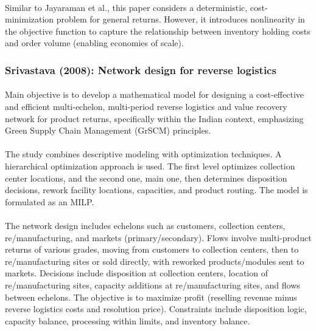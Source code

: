 \paragraph{} Similar to Jayaraman et al., this paper considers a deterministic, cost-minimization problem for general returns. However, it introduces nonlinearity in the objective function to capture the relationship between inventory holding costs and order volume (enabling economies of scale).

\subsubsection{Srivastava (2008): Network design for reverse logistics}

\paragraph{} Main objective is to develop a mathematical model for designing a cost-effective and efficient multi-echelon, multi-period reverse logistics and value recovery network for product returns, specifically within the Indian context, emphasizing Green Supply Chain Management (GrSCM) principles.

\paragraph{} The study combines descriptive modeling with optimization techniques. A hierarchical optimization approach is used. The first level optimizes collection center locations, and the second one, main one, then determines disposition decisions, rework facility locations, capacities, and product routing. The model is formulated as an MILP.

\paragraph{} The network design includes echelons such as customers, collection centers, re/manufacturing, and markets (primary/secondary). Flows involve multi-product returns of various grades, moving from customers to collection centers, then to re/manufacturing sites or sold directly, with reworked products/modules sent to markets. Decisions include disposition at collection centers, location of re/manufacturing sites, capacity additions at re/manufacturing sites, and flows between echelons. The objective is to maximize profit (reselling revenue minus reverse logistics costs and resolution price). Constraints include disposition logic, capacity balance, processing within limits, and inventory balance.

